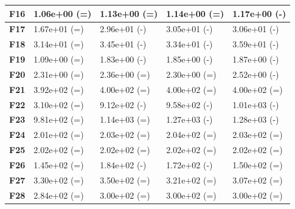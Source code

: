 \documentclass[12pt,a4paper]{report}
\begin{document}
{{{{{{\begin{table}[]
\begin{tabular}{|l|l|l|l|l|}
{\bf F16} & 1.06e+00 (=)        & 1.13e+00 (=)    & 1.14e+00 (=)     & 1.17e+00 (-)     \\ \hline
{\bf F17} & 1.67e+01 (=)        & 2.96e+01 (-)    & 3.05e+01 (-)     & 3.06e+01 (-)     \\ \hline
{\bf F18} & 3.14e+01 (=)        & 3.45e+01 (-)    & 3.34e+01 (-)     & 3.59e+01 (-)     \\ \hline
{\bf F19} & 1.09e+00 (=)        & 1.83e+00 (-)    & 1.85e+00 (-)     & 1.87e+00 (-)     \\ \hline
{\bf F20} & 2.31e+00 (=)        & 2.36e+00 (=)    & 2.30e+00 (=)     & 2.52e+00 (-)     \\ \hline
{\bf F21} & 3.92e+02 (=)        & 4.00e+02 (=)    & 4.00e+02 (=)     & 4.00e+02 (=)     \\ \hline
{\bf F22} & 3.10e+02 (=)        & 9.12e+02 (-)    & 9.58e+02 (-)     & 1.01e+03 (-)     \\ \hline
{\bf F23} & 9.81e+02 (=)        & 1.14e+03 (=)    & 1.27e+03 (-)     & 1.28e+03 (-)     \\ \hline
{\bf F24} & 2.01e+02 (=)        & 2.03e+02 (=)    & 2.04e+02 (=)     & 2.03e+02 (=)     \\ \hline
{\bf F25} & 2.02e+02 (=)        & 2.02e+02 (=)    & 2.02e+02 (=)     & 2.02e+02 (=)     \\ \hline
{\bf F26} & 1.45e+02 (=)        & 1.84e+02 (-)    & 1.72e+02 (-)     & 1.50e+02 (=)     \\ \hline
{\bf F27} & 3.30e+02 (=)        & 3.50e+02 (=)    & 3.21e+02 (=)     & 3.07e+02 (=)     \\ \hline
{\bf F28} & 2.84e+02 (=)        & 3.00e+02 (=)    & 3.00e+02 (=)     & 3.00e+02 (=)     \\ \hline
\end{tabular}
\end{table}

}}}}}}
\end{document}
